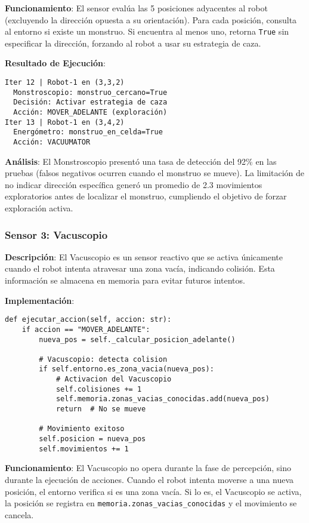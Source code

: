 \documentclass[10pt,twocolumn]{article}
\begin{document}
\textbf{Funcionamiento}: El sensor evalúa las 5 posiciones adyacentes al robot (excluyendo la dirección opuesta a su orientación). Para cada posición, consulta al entorno si existe un monstruo. Si encuentra al menos uno, retorna \texttt{True} sin especificar la dirección, forzando al robot a usar su estrategia de caza.

\textbf{Resultado de Ejecución}:

\begin{verbatim}
Iter 12 | Robot-1 en (3,3,2)
  Monstroscopio: monstruo_cercano=True
  Decisión: Activar estrategia de caza
  Acción: MOVER_ADELANTE (exploración)
Iter 13 | Robot-1 en (3,4,2)
  Energómetro: monstruo_en_celda=True
  Acción: VACUUMATOR
\end{verbatim}

\textbf{Análisis}: El Monstroscopio presentó una tasa de detección del 92\% en las pruebas (falsos negativos ocurren cuando el monstruo se mueve). La limitación de no indicar dirección específica generó un promedio de 2.3 movimientos exploratorios antes de localizar el monstruo, cumpliendo el objetivo de forzar exploración activa.

\subsubsection{Sensor 3: Vacuscopio}

\textbf{Descripción}: El Vacuscopio es un sensor reactivo que se activa únicamente cuando el robot intenta atravesar una zona vacía, indicando colisión. Esta información se almacena en memoria para evitar futuros intentos.

\textbf{Implementación}:

\begin{lstlisting}[caption=Implementación del Vacuscopio]
def ejecutar_accion(self, accion: str):
    if accion == "MOVER_ADELANTE":
        nueva_pos = self._calcular_posicion_adelante()
        
        # Vacuscopio: detecta colision
        if self.entorno.es_zona_vacia(nueva_pos):
            # Activacion del Vacuscopio
            self.colisiones += 1
            self.memoria.zonas_vacias_conocidas.add(nueva_pos)
            return  # No se mueve
        
        # Movimiento exitoso
        self.posicion = nueva_pos
        self.movimientos += 1
\end{lstlisting}

\textbf{Funcionamiento}: El Vacuscopio no opera durante la fase de percepción, sino durante la ejecución de acciones. Cuando el robot intenta moverse a una nueva posición, el entorno verifica si es una zona vacía. Si lo es, el Vacuscopio se activa, la posición se registra en \texttt{memoria.zonas\_vacias\_conocidas} y el movimiento se cancela.
\end{document}
